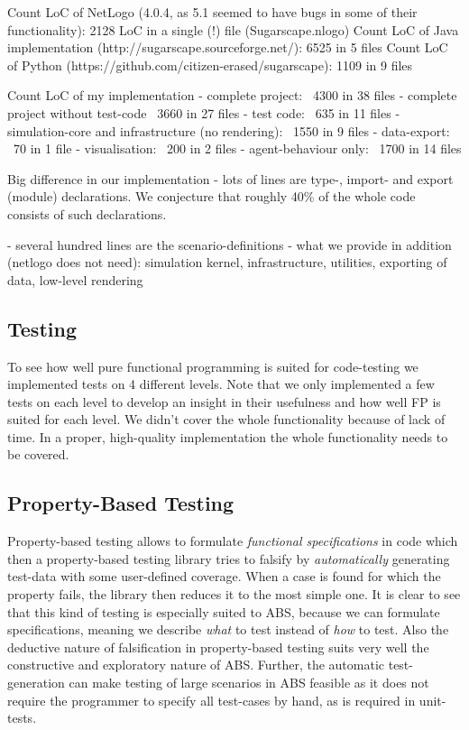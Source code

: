 Count LoC of NetLogo (4.0.4, as 5.1 seemed to have bugs in some of their functionality): 2128 LoC in a single (!) file (Sugarscape.nlogo)
Count LoC of Java implementation (http://sugarscape.sourceforge.net/): 6525 in 5 files
Count LoC of Python (https://github.com/citizen-erased/sugarscape): 1109 in 9 files

Count LoC of my implementation
- complete project: ~4300 in 38 files
- complete project without test-code ~3660 in 27 files
- test code: ~635 in 11 files
- simulation-core and infrastructure (no rendering): ~1550 in 9 files
- data-export: ~70 in 1 file
- visualisation: ~200 in 2 files
- agent-behaviour only: ~1700 in 14 files

Big difference in our implementation
- lots of lines are type-, import- and export (module) declarations. We conjecture that roughly 40\% of the whole code consists of such declarations.

- several hundred lines are the scenario-definitions
- what we provide in addition (netlogo does not need): simulation kernel, infrastructure, utilities, exporting of data, low-level rendering

\subsection{Testing}
To see how well pure functional programming is suited for code-testing we implemented tests on 4 different levels. Note that we only implemented a few tests on each level to develop an insight in their usefulness and how well FP is suited for each level. We didn't cover the whole functionality because of lack of time. In a proper, high-quality implementation the whole functionality needs to be covered. 

\subsection{Property-Based Testing}
Property-based testing allows to formulate \textit{functional specifications} in code which then a property-based testing library tries to falsify by \textit{automatically} generating test-data with some user-defined coverage. When a case is found for which the property fails, the library then reduces it to the most simple one. It is clear to see that this kind of testing is especially suited to ABS, because we can formulate specifications, meaning we describe \textit{what} to test instead of \textit{how} to test. Also the deductive nature of falsification in property-based testing suits very well the constructive and exploratory nature of ABS. Further, the automatic test-generation can make testing of large scenarios in ABS feasible as it does not require the programmer to specify all test-cases by hand, as is required in unit-tests.

